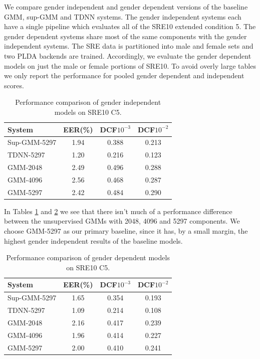 \documentclass{article}
\begin{document}
We compare gender independent and gender dependent versions of the
baseline GMM, sup-GMM and TDNN systems. The gender independent
systems each have a single pipeline which evaluates all of the SRE10
extended condition 5. The gender dependent systems share most of the
same components with the gender independent systems. 
The SRE data is partitioned into male and female sets and two PLDA
backends are trained. Accordingly, we evaluate the gender
dependent models on just the male or female portions of SRE10. To avoid 
overly large
tables we only report the performance for pooled gender dependent
and independent scores.

\begin{table}
\begin{center}
\begin{tabular}{l|ccc}
\hline
System & EER(\%) & DCF$10^{-3}$ & DCF$10^{-2}$ \\ \hline \hline
Sup-GMM-5297 & 1.94 & 0.388 & 0.213 \\
TDNN-5297 & 1.20 & 0.216 & 0.123 \\
GMM-2048 & 2.49 & 0.496 & 0.288 \\
GMM-4096 & 2.56 & 0.468 & 0.287 \\
GMM-5297 & 2.42 & 0.484 & 0.290 \\ \hline
\end{tabular}
\end{center}
\caption{Performance comparison of gender independent models on SRE10 C5.}
\label{gender_ind}
\end{table}

In Tables \ref{gender_ind} and \ref{gender_dep} we see that there
isn't much of a performance difference between
the unsupervised GMMs with 2048, 4096 and 5297 components. 
We choose GMM-5297 as our primary baseline, since it has, by a small margin,
the highest gender independent results of the baseline models.

\begin{table}
\begin{center}
\begin{tabular}{l|ccc}
\hline
System & EER(\%) & DCF$10^{-3}$ & DCF$10^{-2}$ \\ \hline \hline
Sup-GMM-5297 & 1.65 & 0.354 & 0.193 \\
TDNN-5297 & 1.09 & 0.214 & 0.108 \\
GMM-2048 & 2.16 & 0.417 & 0.239 \\
GMM-4096 & 1.96 & 0.414 & 0.227 \\
GMM-5297 & 2.00 & 0.410 & 0.241 \\ \hline
\end{tabular}
\end{center}
\caption{Performance comparison of gender dependent models on SRE10 C5.}
\label{gender_dep}
\end{table}
\end{document}
